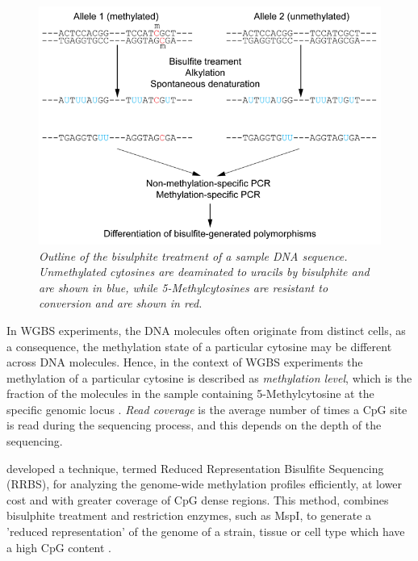 \begin{figure}[!h]
	\begin{center}
 		\includegraphics[scale = 4]{images/bisulphite.png}
		\caption{\emph{Outline of the bisulphite treatment of a sample DNA sequence. Unmethylated cytosines are deaminated to uracils by bisulphite and are shown in blue, while 5-Methylcytosines are resistant to conversion and are shown in red.}}
		\label{bisulphite-pic}
	\end{center}
\end{figure} 

In WGBS experiments, the DNA molecules often originate from distinct cells, as a consequence, the methylation state of a particular cytosine may be different across DNA molecules. Hence, in the context of WGBS experiments the methylation of a particular cytosine is described as \emph{methylation level}, which is the fraction of the molecules in the sample containing 5-Methylcytosine at the specific genomic locus \citep{Schultz2012}. \emph{Read coverage} is the average number of times a CpG site is read during the sequencing process, and this depends on the depth of the sequencing.

\cite{Meissner2005} developed a technique, termed Reduced Representation Bisulfite Sequencing (RRBS), for analyzing the genome-wide methylation profiles efficiently, at lower cost and with greater coverage of CpG dense regions. This method, combines bisulphite treatment and restriction enzymes, such as MspI, to generate a 'reduced representation' of the genome of a strain, tissue or cell type which have a high CpG content \citep{Meissner2005}. 

